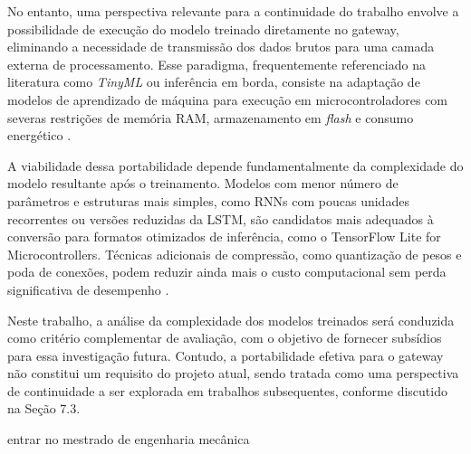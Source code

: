 No entanto, uma perspectiva relevante para a continuidade do trabalho envolve 
a possibilidade de execução do modelo treinado diretamente no gateway, 
eliminando a necessidade de transmissão dos dados brutos para uma camada 
externa de processamento. Esse paradigma, frequentemente referenciado na 
literatura como \textit{TinyML} ou inferência em borda, consiste na adaptação 
de modelos de aprendizado de máquina para execução em microcontroladores com 
severas restrições de memória RAM, armazenamento em \textit{flash} e consumo 
energético \cite{ray2022}.

A viabilidade dessa portabilidade depende fundamentalmente da complexidade do 
modelo resultante após o treinamento. Modelos com menor número de parâmetros 
e estruturas mais simples, como RNNs com poucas unidades recorrentes ou 
versões reduzidas da LSTM, são candidatos mais adequados à conversão para 
formatos otimizados de inferência, como o TensorFlow Lite for 
Microcontrollers. Técnicas adicionais de compressão, como quantização de 
pesos e poda de conexões, podem reduzir ainda mais o custo computacional sem 
perda significativa de desempenho \cite{jacob2018}.

Neste trabalho, a análise da complexidade dos modelos treinados será 
conduzida como critério complementar de avaliação, com o objetivo de fornecer 
subsídios para essa investigação futura. Contudo, a portabilidade efetiva 
para o gateway não constitui um requisito do projeto atual, sendo tratada 
como uma perspectiva de continuidade a ser explorada em trabalhos 
subsequentes, conforme discutido na Seção 7.3.



entrar no mestrado de engenharia mecânica